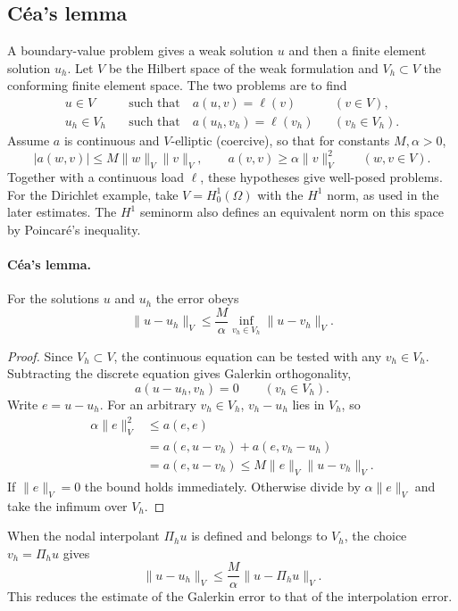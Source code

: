 \documentclass[11pt,a4paper]{article}
\begin{document}
\subsection{Céa's lemma}

A boundary-value problem gives a weak solution \(u\) and then a finite element solution \(u_h\). Let \(V\) be the Hilbert space of the weak formulation and \(V_h\subset V\) the conforming finite element space. The two problems are to find
\begin{align}
 u\in V&\quad\text{such that}\quad a(u,v)=\ell(v)
       &&(v\in V),\label{eq:781-l15-weak}\\
 u_h\in V_h&\quad\text{such that}\quad a(u_h,v_h)=\ell(v_h)
       &&(v_h\in V_h).\label{eq:781-l15-discrete}
\end{align}
Assume \(a\) is continuous and \(V\)-elliptic (coercive), so that for constants \(M,\alpha>0\),
\[
 |a(w,v)|\le M\|w\|_V\|v\|_V,\qquad
 a(v,v)\ge \alpha\|v\|_V^2\qquad(w,v\in V).
\]
Together with a continuous load \(\ell\), these hypotheses give well-posed problems. For the Dirichlet example, take \(V=H_0^1(\Omega)\) with the \(H^1\) norm, as used in the later estimates. The \(H^1\) seminorm also defines an equivalent norm on this space by Poincaré's inequality.

\paragraph{Céa's lemma.}
For the solutions \(u\) and \(u_h\) the error obeys
\[
 \|u-u_h\|_V\le \frac{M}{\alpha}
                      \inf_{v_h\in V_h}\|u-v_h\|_V.
\]
\begin{proof}
Since \(V_h\subset V\), the continuous equation can be tested with any \(v_h\in V_h\). Subtracting the discrete equation gives Galerkin orthogonality,
\[
 a(u-u_h,v_h)=0 \qquad(v_h\in V_h).
\]
Write \(e=u-u_h\). For an arbitrary \(v_h\in V_h\), \(v_h-u_h\) lies in \(V_h\), so
\begin{align*}
 \alpha\|e\|_V^2
 &\le a(e,e)\\
 &=a(e,u-v_h)+a(e,v_h-u_h)\\
 &=a(e,u-v_h)
 \le M\|e\|_V\|u-v_h\|_V .
\end{align*}
If \(\|e\|_V=0\) the bound holds immediately. Otherwise divide by \(\alpha\|e\|_V\) and take the infimum over \(V_h\).
\end{proof}
When the nodal interpolant \(\Pi_hu\) is defined and belongs to \(V_h\), the choice \(v_h=\Pi_hu\) gives
\[
 \|u-u_h\|_V\le \frac{M}{\alpha}\|u-\Pi_hu\|_V .
\]
This reduces the estimate of the Galerkin error to that of the interpolation error.
\end{document}
